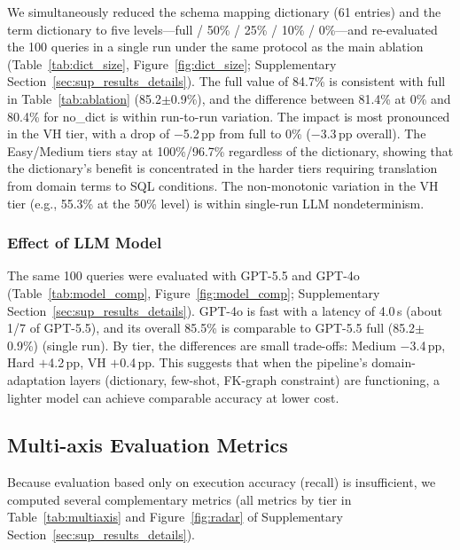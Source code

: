We simultaneously reduced the schema mapping dictionary (61 entries) and the term dictionary to five levels---full / 50\% / 25\% / 10\% / 0\%---and re-evaluated the 100 queries in a single run under the same protocol as the main ablation (Table~\ref{tab:dict_size}, Figure~\ref{fig:dict_size}; Supplementary Section~\ref{sec:sup_results_details}). The full value of 84.7\% is consistent with full in Table~\ref{tab:ablation} (85.2$\pm$0.9\%), and the difference between 81.4\% at 0\% and 80.4\% for no\_dict is within run-to-run variation. The impact is most pronounced in the VH tier, with a drop of $-$5.2\,pp from full to 0\% ($-$3.3\,pp overall). The Easy/Medium tiers stay at 100\%/96.7\% regardless of the dictionary, showing that the dictionary's benefit is concentrated in the harder tiers requiring translation from domain terms to SQL conditions. The non-monotonic variation in the VH tier (e.g., 55.3\% at the 50\% level) is within single-run LLM nondeterminism.

\subsubsection{Effect of LLM Model}
\label{sec:model_comparison}

The same 100 queries were evaluated with GPT-5.5 and GPT-4o (Table~\ref{tab:model_comp}, Figure~\ref{fig:model_comp}; Supplementary Section~\ref{sec:sup_results_details}). GPT-4o is fast with a latency of 4.0\,s (about 1/7 of GPT-5.5), and its overall 85.5\% is comparable to GPT-5.5 full (85.2$\pm$0.9\%) (single run). By tier, the differences are small trade-offs: Medium $-$3.4\,pp, Hard $+$4.2\,pp, VH $+$0.4\,pp. This suggests that when the pipeline's domain-adaptation layers (dictionary, few-shot, FK-graph constraint) are functioning, a lighter model can achieve comparable accuracy at lower cost.


\subsection{Multi-axis Evaluation Metrics}

\label{sec:multiaxis}

Because evaluation based only on execution accuracy (recall) is insufficient, we computed several complementary metrics (all metrics by tier in Table~\ref{tab:multiaxis} and Figure~\ref{fig:radar} of Supplementary Section~\ref{sec:sup_results_details}).

